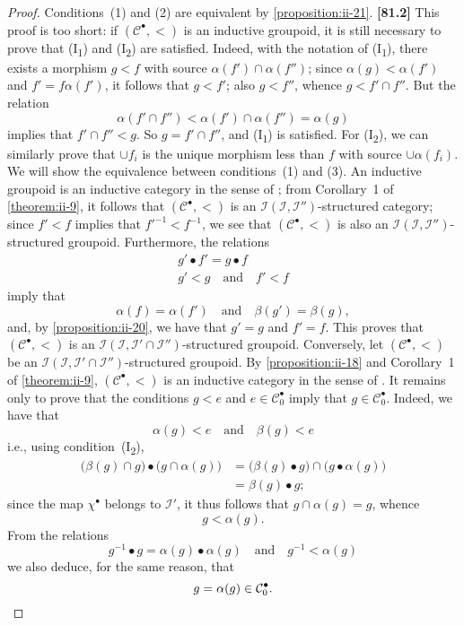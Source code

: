 \documentclass[a4paper,fleqn]{article}
\theoremstyle{plain}
\theoremstyle{definition}
\newenvironment{longcomm}[1]
  {\noindent\textbf{[#1]}\rmfamily}
  {}
\newcommand{\oldpage}[1]{{\marginpar{\footnotesize$\bigg\vert$\,\,\,\,\textit{p.~#1}}}}
\newcommand{\textand}{\quad\text{and}\quad}
\newcommand{\CC}{\mathcal{C}}
\newcommand{\II}{\mathcal{I}}
\begin{document}
\begin{proof}
  Conditions~(1) and (2) are equivalent by \cref{proposition:ii-21}.
  \begin{longcomm}{81.2}
    This proof is too short: if $(\CC^\bullet,<)$ is an inductive groupoid, it is still necessary to prove that (I\textsubscript{1}) and (I\textsubscript{2}) are satisfied.
    Indeed, with the notation of (I\textsubscript{1}), there exists a morphism $g<f$ with source $\alpha(f')\cap\alpha(f'')$;
    since $\alpha(g)<\alpha(f')$ and $f'=f\alpha(f')$, it follows that $g<f'$;
    also $g<f''$, whence $g<f'\cap f''$.
    But the relation
    \[
      \alpha(f'\cap f'')
      < \alpha(f')\cap\alpha(f'')
      = \alpha(g)
    \]
    implies that $f'\cap f''<g$.
    So $g=f'\cap f''$, and (I\textsubscript{1}) is satisfied.
    For (I\textsubscript{2}), we can similarly prove that $\cup f_i$ is the unique morphism less than $f$ with source $\cup\alpha(f_i)$.
  \end{longcomm}
  We will show the equivalence between conditions~(1) and (3).
  An inductive groupoid is an inductive category in the sense of \cite{3c};
  from Corollary~1 of \cref{theorem:ii-9}, it follows that $(\CC^\bullet,<)$ is an $\II(\II,\II'')$-structured category;
  since $f'<f$ implies that $f'^{-1}<f^{-1}$, we see that $(\CC^\bullet,<)$ is also an $\II(\II,\II'')$-structured groupoid.
  Furthermore, the relations
  \[
    \begin{gathered}
      g'\bullet f'=g\bullet f
    \\g'<g
      \textand
      f'<f
    \end{gathered}
  \]
  imply that
  \[
    \alpha(f)=\alpha(f')
    \textand
    \beta(g')=\beta(g),
  \]
  and, by \cref{proposition:ii-20}, we have that $g'=g$ and $f'=f$.
  This proves that $(\CC^\bullet,<)$ is an $\II(\II,\II'\cap\II'')$-structured groupoid.
  Conversely, let $(\CC^\bullet,<)$ be an $\II(\II,\II'\cap\II'')$-structured groupoid.
  By \cref{proposition:ii-18} and Corollary~1 of \cref{theorem:ii-9}, $(\CC^\bullet,<)$ is an inductive category in the sense of \cite{3c}.
  \oldpage{410}
  It remains only to prove that the conditions $g<e$ and $e\in\CC_0^\bullet$ imply that $g\in\CC_0^\bullet$.
  Indeed, we have that
  \[
    \alpha(g)<e
    \textand
    \beta(g)<e
  \]
  i.e., using condition~(I\textsubscript{2}),
  \[
    \begin{aligned}
      \big(\beta(g)\cap g\big)\bullet\big(g\cap\alpha(g)\big)
      &= \big(\beta(g)\bullet g\big)\cap\big(g\bullet\alpha(g)\big)
    \\&= \beta(g)\bullet g;
    \end{aligned}
  \]
  since the map $\chi^\bullet$ belongs to $\II'$, it thus follows that $g\cap\alpha(g)=g$, whence
  \[
    g<\alpha(g).
  \]
  From the relations
  \[
    g^{-1}\bullet g=\alpha(g)\bullet\alpha(g)
    \textand
    g^{-1}<\alpha(g)
  \]
  we also deduce, for the same reason, that
  \[
    g
    = \alpha(g)
    \in \CC_0^\bullet.
    \qedhere
  \]
\end{proof}
\end{document}
